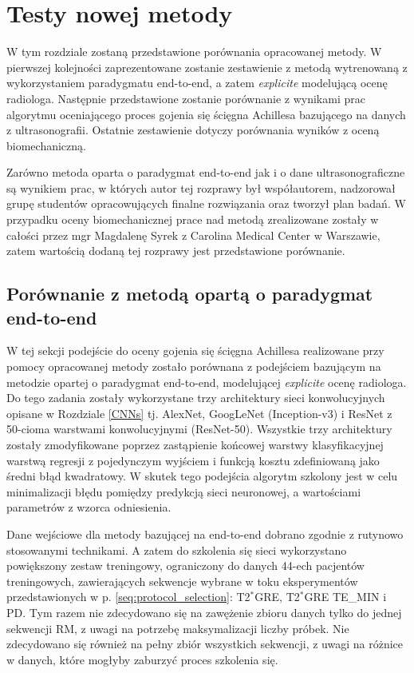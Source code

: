 \chapter{Testy nowej metody}

W tym rozdziale zostaną przedstawione porównania opracowanej metody. \linebreak W pierwszej kolejności zaprezentowane zostanie zestawienie z metodą wytrenowaną z wykorzystaniem paradygmatu end-to-end, a zatem \textit{explicite} modelującą ocenę radiologa. Następnie przedstawione zostanie porównanie z wynikami prac algorytmu oceniającego proces gojenia się ścięgna Achillesa bazującego na danych z ultrasonografii. Ostatnie zestawienie dotyczy porównania wyników z oceną biomechaniczną.

Zarówno metoda oparta o paradygmat end-to-end jak i o dane ultrasonograficzne są wynikiem prac, w których autor tej rozprawy był współautorem, nadzorował grupę studentów opracowujących finalne rozwiązania oraz tworzył plan badań. \linebreak W przypadku oceny biomechanicznej prace nad metodą zrealizowane zostały w całości przez mgr Magdalenę Syrek z Carolina Medical Center w Warszawie, zatem wartością dodaną tej rozprawy jest przedstawione porównanie.   

\section{Porównanie z metodą opartą o paradygmat end-to-end}
\label{seq:end-to-end}
W tej sekcji podejście do oceny gojenia się ścięgna Achillesa realizowane przy pomocy opracowanej metody zostało porównana z podejściem bazującym na metodzie opartej o paradygmat end-to-end, modelującej \textit{explicite} ocenę radiologa. \linebreak Do tego zadania zostały wykorzystane trzy architektury sieci konwolucyjnych opisane w Rozdziale \ref{CNNs} tj. AlexNet, GoogLeNet (Inception-v3) i ResNet z 50-cioma warstwami konwolucyjnymi (ResNet-50). Wszystkie trzy architektury zostały zmodyfikowane poprzez zastąpienie końcowej warstwy klasyfikacyjnej warstwą regresji \linebreak z pojedynczym wyjściem i funkcją kosztu zdefiniowaną jako średni błąd kwadratowy. W skutek tego podejścia algorytm szkolony jest w celu minimalizacji błędu pomiędzy predykcją sieci neuronowej, a wartościami parametrów z wzorca odniesienia. 

Dane wejściowe dla metody bazującej na end-to-end dobrano zgodnie z rutynowo stosowanymi technikami. A zatem do szkolenia się sieci wykorzystano powiększony zestaw treningowy, ograniczony do danych 44-ech pacjentów treningowych, zawierających sekwencje wybrane w toku eksperymentów przedstawionych w p. \ref{seq:protocol_selection}: T2$^\ast$GRE, T2$^\ast$GRE TE\_MIN i PD. Tym razem nie zdecydowano się na zawężenie zbioru danych tylko do jednej sekwencji RM, z uwagi na potrzebę maksymalizacji liczby próbek. Nie zdecydowano się również na pełny zbiór wszystkich sekwencji, z uwagi na różnice w danych, które mogłyby zaburzyć proces szkolenia się. 

